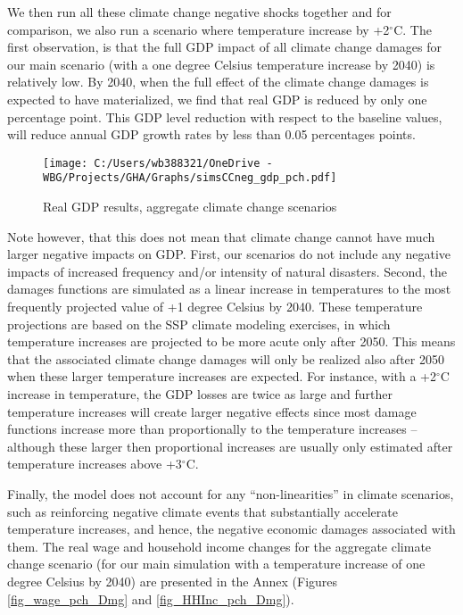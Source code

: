 \documentclass[11pt,english]{article}
\begin{document}
We then run all these climate change negative shocks together and for comparison, we also run a scenario where temperature increase by +2$^{\circ}$C. The first observation, is that the full GDP impact of all climate change damages for our main scenario (with a one degree Celsius temperature increase by 2040) is relatively low. By 2040, when the full effect of the climate change damages is expected to have materialized, we find that real GDP is reduced by only one percentage point. This GDP level reduction with respect to the baseline values, will reduce annual GDP growth rates by less than 0.05 percentages points.

\begin{figure}[ht!]\caption{Real GDP results, aggregate climate change scenarios} \label{fig_simsCCneg_gdp_pch}
	\centering
	\texttt{[image: C:/Users/wb388321/OneDrive - WBG/Projects/GHA/Graphs/simsCCneg\_gdp\_pch.pdf]}
\end{figure}

Note however, that this does not mean that climate change cannot have much larger negative impacts on GDP. First, our scenarios do not include any negative impacts of increased frequency and/or intensity of natural disasters. Second, the damages functions are simulated as a linear increase in temperatures to the most frequently projected value of +1 degree Celsius by 2040. These temperature projections are based on the SSP climate modeling exercises, in which temperature increases are projected to be more acute only after 2050. This means that the associated climate change damages will only be realized also after 2050 when these larger temperature increases are expected. For instance, with a +2$^{\circ}$C increase in temperature, the GDP losses are twice as large and further temperature increases will create larger negative effects since most damage functions increase more than proportionally to the temperature increases --although these larger then proportional increases are usually only estimated after temperature increases above +3$^{\circ}$C.

Finally, the model does not account for any ``non-linearities'' in climate scenarios, such as reinforcing negative climate events that substantially accelerate temperature increases, and hence, the negative economic damages associated with them. The real wage and household income changes for the aggregate climate change scenario (for our main simulation with a temperature increase of one degree Celsius by 2040) are presented in the Annex (Figures \ref{fig_wage_pch_Dmg} and \ref{fig_HHInc_pch_Dmg}).
\end{document}
